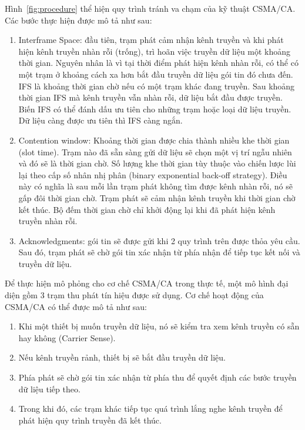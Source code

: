 Hình~\ref{fig:procedure} thể hiện quy trình tránh va chạm của kỹ thuật CSMA/CA. Các bước thực hiện được mô tả như sau:
\begin{enumerate}
    \item Interframe Space: đầu tiên, trạm phát cảm nhận kênh truyền và khi phát hiện kênh truyền nhàn rỗi (trống), trì hoãn việc truyền dữ liệu một khoảng thời gian. Nguyên nhân là vì tại thời điểm phát hiện kênh nhàn rỗi, có thể có một trạm ở khoảng cách xa hơn bắt đầu truyền dữ liệu gói tin đó chưa đến. IFS là khoảng thời gian chờ nếu có một trạm khác đang truyền. Sau khoảng thời gian IFS mà kênh truyền vẫn nhàn rỗi, dữ liệu bắt đầu được truyền. Biến IFS có thể đánh dấu ưu tiên cho những trạm hoặc loại dữ liệu truyền. Dữ liệu càng được ưu tiên thì IFS càng ngắn.
    \item Contention window: Khoảng thời gian được chia thành nhiều khe thời gian (slot time). Trạm nào đã sẵn sàng gửi dữ liệu sẽ chọn một vị trí ngẫu nhiên và đó sẽ là thời gian chờ. Số lượng khe thời gian tùy thuộc vào chiến lược lùi lại theo cấp số nhân nhị phân (binary exponential back-off strategy). Điều này có nghĩa là sau mỗi lần trạm phát không tìm được kênh nhàn rỗi, nó sẽ gấp đôi thời gian chờ. Trạm phát sẽ cảm nhận kênh truyền khi thời gian chờ kết thúc. Bộ đếm thời gian chờ chỉ khởi động lại khi đã phát hiện kênh truyền nhàn rỗi.
    \item Acknowledgments: gói tin sẽ được gửi khi 2 quy trình trên được thỏa yêu cầu. Sau đó, trạm phát sẽ chờ gói tin xác nhận từ phía nhận để tiếp tục kết nối và truyền dữ liệu.
\end{enumerate}

Để thực hiện mô phỏng cho cơ chế CSMA/CA trong thực tế, một mô hình đại diện gồm 3 trạm thu phát tín hiệu được sử dụng. Cơ chế hoạt động của CSMA/CA có thể được mô tả như sau:
\begin{enumerate}
    \item Khi một thiết bị muốn truyền dữ liệu, nó sẽ kiểm tra xem kênh truyền có sẵn hay không (Carrier Sense).
    \item Nếu kênh truyền rảnh, thiết bị sẽ bắt đầu truyền dữ liệu.
    \item Phía phát sẽ chờ gói tin xác nhận từ phía thu để quyết định các bước truyền dữ liệu tiếp theo.
    \item Trong khi đó, các trạm khác tiếp tục quá trình lắng nghe kênh truyền để phát hiện quy trình truyền đã kết thúc.
\end{enumerate}

